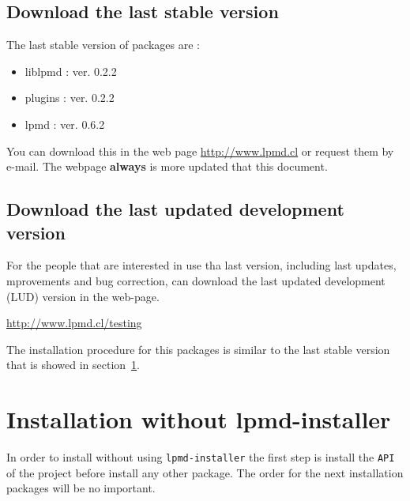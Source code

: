 \subsection{Download the last stable version}

The last stable version of {\lpmd} packages are :

\begin{itemize}
 \item liblpmd : ver. 0.2.2
 \item plugins : ver. 0.2.2
 \item lpmd    : ver. 0.6.2
\end{itemize}

You can download this in the web page \url{http://www.lpmd.cl} or request them 
by e-mail. The webpage \textbf{always} is more updated that this document.

\subsection{Download the last updated development version}

For the people that are interested in use tha last version, including last
updates, mprovements and bug correction, can download the last updated
development (LUD) version in the web-page.

\url{http://www.lpmd.cl/testing}

The installation procedure for this packages is similar to the last stable
version that is showed in section~\ref{sec:withoutinstaller}.

\section{Installation without lpmd-installer}
\label{sec:withoutinstaller}

In order to install {\lpmd} without using \verb|lpmd-installer| the first step
is install the \verb|API| of the project before install any other package. The
order for the next installation packages will be no important.


